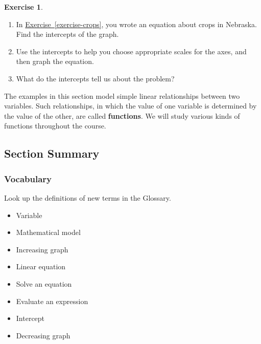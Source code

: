 \documentclass[10pt,]{book}
\newcommand{\terminology}[1]{\textbf{#1}}
\theoremstyle{plain}
\theoremstyle{definition}
\theoremstyle{definition}
\theoremstyle{definition}
\newtheorem{exercise}[theorem]{Exercise}
\numberwithin{equation}{part}
\begin{document}
\begin{exercise}\label{exercise-intercepts}
\leavevmode%
\begin{enumerate}[label=\alph*]
\item\hypertarget{li-73}{}In \hyperref[exercise-crops]{Exercise~\ref{exercise-crops}}, you wrote an equation about crops in Nebraska. Find the intercepts of the graph.%
\item\hypertarget{li-74}{}Use the intercepts to help you choose appropriate scales for the axes, and then graph the equation.%
\item\hypertarget{li-75}{}What do the intercepts tell us about the problem?%
\end{enumerate}
\end{exercise}
The examples in this section model simple linear relationships between two variables. Such relationships, in which the value of one variable is determined by the value of the other, are called \terminology{functions}. We will study various kinds of functions throughout the course.%
\typeout{************************************************}
\typeout{************************************************}
\subsection[{Section Summary}]{Section Summary}\label{summary-1-1}
\typeout{************************************************}
\typeout{************************************************}
\subsubsection[{Vocabulary}]{Vocabulary}\label{subsubsection-1}
Look up the definitions of new terms in the Glossary. \leavevmode%
\begin{multicols}{3}
\begin{itemize}[label=\textbullet]
\item{}Variable%
\item{}Mathematical model%
\item{}Increasing graph%
\item{}Linear equation%
\item{}Solve an equation%
\item{}Evaluate an expression%
\item{}Intercept%
\item{}Decreasing graph%
\end{itemize}
\end{multicols}
%
\typeout{************************************************}
\typeout{************************************************}
\end{document}
